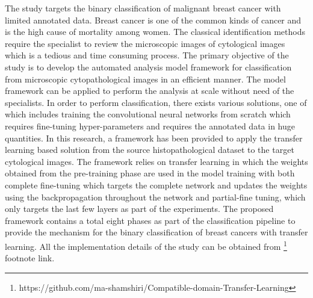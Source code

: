 The study targets the binary classification of malignant breast cancer with limited annotated data. Breast cancer is one of the common kinds of cancer and is the high cause of mortality among women. The classical identification methods require the specialist to  review the microscopic images of cytological images which is a tedious and time consuming process. The primary objective of the study is to develop the automated analysis model framework for classification from microscopic cytopathological images in an efficient manner. The model framework can be applied to perform the analysis at scale without need of the specialists. 
In order to perform classification, there exists various solutions, one of which includes training the convolutional neural networks from scratch which requires fine-tuning hyper-parameters and requires the annotated data in huge quantities. In this research, a framework has been provided to apply the transfer learning based solution from the source histopathological dataset to the target cytological images. The framework relies on transfer learning in which the weights obtained from the pre-training phase are used in the model training with both complete fine-tuning which targets the complete network and updates the weights using the backpropagation throughout the network  and partial-fine tuning, which only targets the last few layers as part of the experiments. 
The proposed framework contains a total eight phases as part of  the classification pipeline to provide the mechanism for the binary classification of breast cancers with transfer learning. All the implementation details of the study can be obtained from \footnote[1]{https://github.com/ma-shamshiri/Compatible-domain-Transfer-Learning} footnote link.
